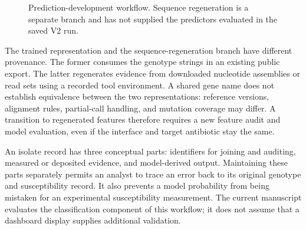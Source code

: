 \documentclass[conference]{IEEEtran}
\begin{document}
\begin{figure}[t]
\centering
{}
\caption{Prediction-development workflow. Sequence regeneration is a separate branch and has not supplied the predictors evaluated in the saved V2 run.}
\label{fig:workflow}
\end{figure}

The trained representation and the sequence-regeneration branch have different provenance. The former consumes the genotype strings in an existing public export. The latter regenerates evidence from downloaded nucleotide assemblies or read sets using a recorded tool environment. A shared gene name does not establish equivalence between the two representations: reference versions, alignment rules, partial-call handling, and mutation coverage may differ. A transition to regenerated features therefore requires a new feature audit and model evaluation, even if the interface and target antibiotic stay the same.

An isolate record has three conceptual parts: identifiers for joining and auditing, measured or deposited evidence, and model-derived output. Maintaining these parts separately permits an analyst to trace an error back to its original genotype and susceptibility record. It also prevents a model probability from being mistaken for an experimental susceptibility measurement. The current manuscript evaluates the classification component of this workflow; it does not assume that a dashboard display supplies additional validation.
\end{document}
